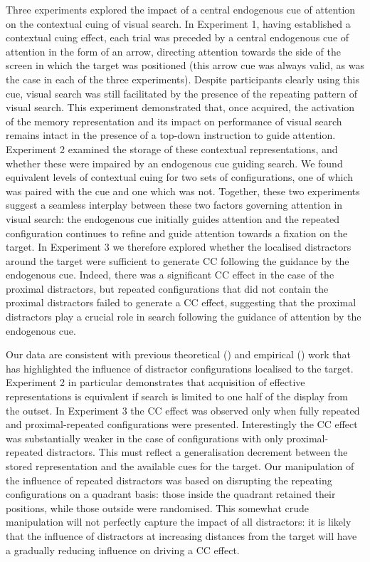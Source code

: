\documentclass[
  man,
  floatsintext,
  longtable,
  nolmodern,
  notxfonts,
  notimes,
  colorlinks=true,linkcolor=blue,citecolor=blue,urlcolor=blue]{apa7}
\begin{document}
Three experiments explored the impact of a central endogenous cue of
attention on the contextual cuing of visual search. In Experiment 1,
having established a contextual cuing effect, each trial was preceded by
a central endogenous cue of attention in the form of an arrow, directing
attention towards the side of the screen in which the target was
positioned (this arrow cue was always valid, as was the case in each of
the three experiments). Despite participants clearly using this cue,
visual search was still facilitated by the presence of the repeating
pattern of visual search. This experiment demonstrated that, once
acquired, the activation of the memory representation and its impact on
performance of visual search remains intact in the presence of a
top-down instruction to guide attention. Experiment 2 examined the
storage of these contextual representations, and whether these were
impaired by an endogenous cue guiding search. We found equivalent levels
of contextual cuing for two sets of configurations, one of which was
paired with the cue and one which was not. Together, these two
experiments suggest a seamless interplay between these two factors
governing attention in visual search: the endogenous cue initially
guides attention and the repeated configuration continues to refine and
guide attention towards a fixation on the target. In Experiment 3 we
therefore explored whether the localised distractors around the target
were sufficient to generate CC following the guidance by the endogenous
cue. Indeed, there was a significant CC effect in the case of the
proximal distractors, but repeated configurations that did not contain
the proximal distractors failed to generate a CC effect, suggesting that
the proximal distractors play a crucial role in search following the
guidance of attention by the endogenous cue.

Our data are consistent with previous theoretical
() and empirical
() work that has
highlighted the influence of distractor configurations localised to the
target. Experiment 2 in particular demonstrates that acquisition of
effective representations is equivalent if search is limited to one half
of the display from the outset. In Experiment 3 the CC effect was
observed only when fully repeated and proximal-repeated configurations
were presented. Interestingly the CC effect was substantially weaker in
the case of configurations with only proximal-repeated distractors. This
must reflect a generalisation decrement between the stored
representation and the available cues for the target. Our manipulation
of the influence of repeated distractors was based on disrupting the
repeating configurations on a quadrant basis: those inside the quadrant
retained their positions, while those outside were randomised. This
somewhat crude manipulation will not perfectly capture the impact of all
distractors: it is likely that the influence of distractors at
increasing distances from the target will have a gradually reducing
influence on driving a CC effect.
\end{document}
